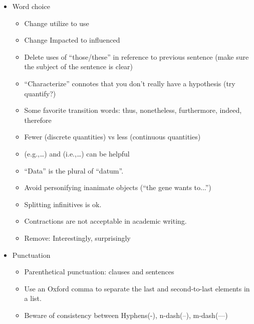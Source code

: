 {\begin{tips}
\begin{itemize}[noitemsep]
\begin{itemize}[noitemsep]
                    \item Don’t claim you’re the first ever (or save that for the cover later)
                    \item Generally speaking, avoid passive voice. If you can add “by zombies” after the verb and it still makes sense...rethink your phrasing
                \end{itemize}
            \item Word choice
                \begin{itemize}[noitemsep]
                    \item Change utilize to use 
                    \item Change Impacted to influenced
                    \item Delete uses of “those/these” in reference to previous sentence (make sure the subject of the sentence is clear)
                    \item “Characterize” connotes that you don’t really have a hypothesis (try quantify?)
                    \item Some favorite transition words: thus, nonetheless, furthermore, indeed, therefore
                    \item Fewer (discrete quantities) vs less (continuous quantities)
                    \item (e.g.,\dots) and (i.e.,\dots) can be helpful
                    \item “Data” is the plural of “datum”.
                    \item Avoid personifying inanimate objects (“the gene wants to...”)
                    \item Splitting infinitives is ok.
                    \item Contractions are not acceptable in academic writing.
                    \item Remove: Interestingly, surprisingly
                \end{itemize}
            \item Punctuation
                \begin{itemize}[noitemsep]
                    \item Parenthetical punctuation: clauses and sentences
                    \item Use an Oxford comma to separate the last and second-to-last elements in a list.
                    \item Beware of consistency between Hyphens(-), n-dash(--), m-dash(---)

\end{itemize}
\end{itemize}
\end{tips}}
